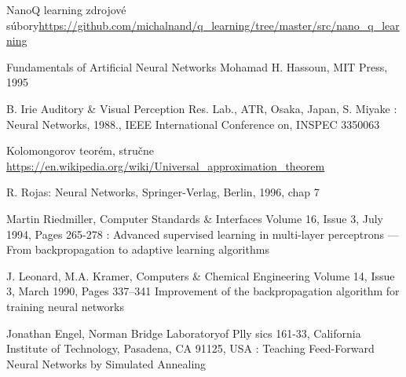 \begin{thebibliography}{99}                                \label{literatura}

NanoQ learning zdrojové súbory\url{https://github.com/michalnand/q_learning/tree/master/src/nano_q_learning}

Fundamentals of Artificial Neural Networks Mohamad H. Hassoun, MIT Press, 1995

B. Irie Auditory \& Visual Perception Res. Lab., ATR, Osaka, Japan, S. Miyake :
Neural Networks, 1988., IEEE International Conference on, INSPEC 3350063

Kolomongorov teorém, stručne
\url{https://en.wikipedia.org/wiki/Universal_approximation_theorem}

R. Rojas: Neural Networks, Springer-Verlag, Berlin, 1996, chap 7

Martin Riedmiller,  Computer Standards \& Interfaces Volume 16, Issue 3, July 1994, Pages 265-278 :
Advanced supervised learning in multi-layer perceptrons — From backpropagation to adaptive learning algorithms

J. Leonard, M.A. Kramer, Computers \& Chemical Engineering Volume 14, Issue 3, March 1990, Pages 337–341
Improvement of the backpropagation algorithm for training neural networks

 Jonathan Engel,
Norman Bridge Laboratoryof Plly sics 161-33, California Institute of Technology,
Pasadena, CA 91125, USA : Teaching Feed-Forward Neural Networks by Simulated Annealing

\end{thebibliography}
